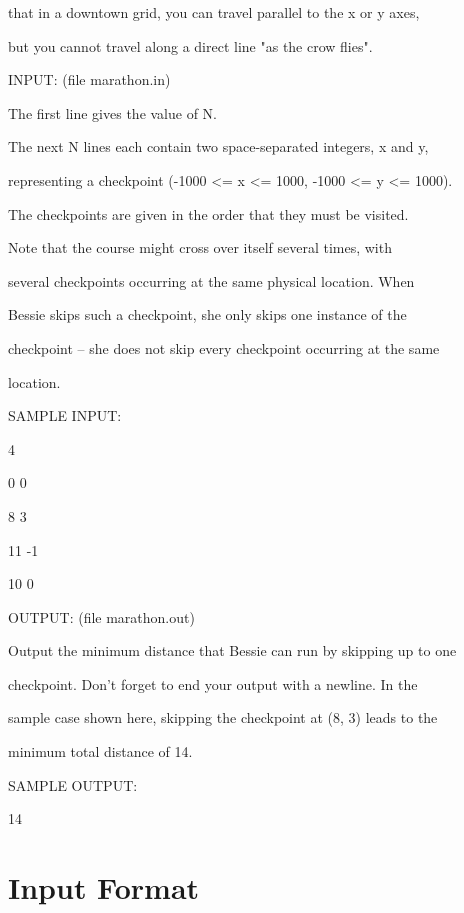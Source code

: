 \documentclass[12pt]{article}
\begin{document}
that in a downtown grid, you can travel parallel to the x or y axes,

but you cannot travel along a direct line "as the crow flies".



INPUT: (file marathon.in)



The first line gives the value of N.



The next N lines each contain two space-separated integers, x and y,

representing a checkpoint (-1000 <= x <= 1000, -1000 <= y <= 1000).

The checkpoints are given in the order that they must be visited.

Note that the course might cross over itself several times, with

several checkpoints occurring at the same physical location.  When

Bessie skips such a checkpoint, she only skips one instance of the

checkpoint -- she does not skip every checkpoint occurring at the same

location.



SAMPLE INPUT:



4

0 0

8 3

11 -1

10 0



OUTPUT: (file marathon.out)



Output the minimum distance that Bessie can run by skipping up to one

checkpoint.  Don't forget to end your output with a newline.  In the

sample case shown here, skipping the checkpoint at (8, 3) leads to the

minimum total distance of 14.



SAMPLE OUTPUT:



14




\section*{Input Format}
\end{document}
